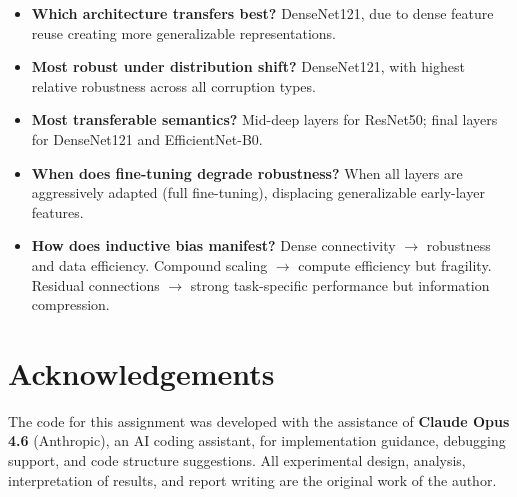 \documentclass[11pt, a4paper]{article}
\begin{document}
\begin{itemize}[nosep]
    \item \textbf{Which architecture transfers best?} DenseNet121, due to dense feature reuse creating more generalizable representations.
    \item \textbf{Most robust under distribution shift?} DenseNet121, with highest relative robustness across all corruption types.
    \item \textbf{Most transferable semantics?} Mid-deep layers for ResNet50; final layers for DenseNet121 and EfficientNet-B0.
    \item \textbf{When does fine-tuning degrade robustness?} When all layers are aggressively adapted (full fine-tuning), displacing generalizable early-layer features.
    \item \textbf{How does inductive bias manifest?} Dense connectivity $\rightarrow$ robustness and data efficiency. Compound scaling $\rightarrow$ compute efficiency but fragility. Residual connections $\rightarrow$ strong task-specific performance but information compression.
\end{itemize}

\section*{Acknowledgements}

The code for this assignment was developed with the assistance of \textbf{Claude Opus 4.6} (Anthropic), an AI coding assistant, for implementation guidance, debugging support, and code structure suggestions. All experimental design, analysis, interpretation of results, and report writing are the original work of the author.
\end{document}
